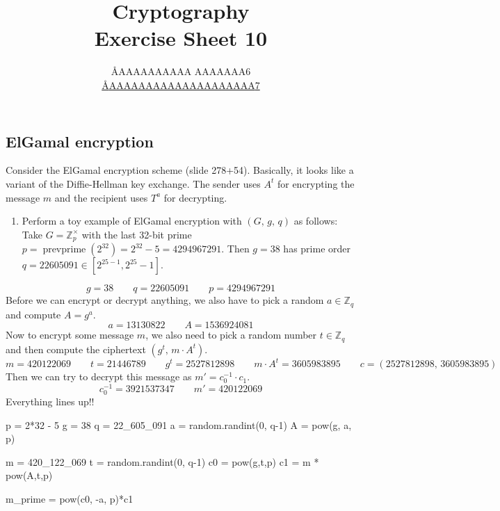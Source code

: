 \documentclass{article}
\title{Cryptography \\ Exercise Sheet 10}
\author{
  \AA{AAAAAAAAAA AAAAAAA}{6} \\
  \href{mailto:\AA{AAAAAAAAAAAAAAAAAAAA}{7}}{\AA{AAAAAAAAAAAAAAAAAAAA}{7}}
}
\newcommand{\Z}{\mathbb{Z}}
\begin{document}
  \maketitle

  \setcounter{section}{10}
  \subsection{ElGamal encryption}
  \begin{centerframebox}
    Consider the ElGamal encryption scheme (slide 278+54). Basically, it looks
    like a variant of the Diffie-Hellman key exchange. The sender uses $A^t$
    for encrypting the message $m$ and the recipient uses $T^a$ for decrypting.

    \begin{enumerate}[label=(\roman*)]
      \item Perform a toy example of ElGamal encryption with $(G,\, g,\, q)$ as follows:
      Take $G = \Z^\times_p$  with the last 32-bit prime $p = \operatorname{prevprime}(2^{32}) = 2^{32} - 5 = 4 294 967 291$.
      Then $g = 38$ has prime order $q = 22 605 091 \in [2^{25-1}, 2^{25}-1]$.
    \end{enumerate}
  \end{centerframebox}
  \[ g = 38 \qquad q = 22 605 091 \qquad p = 4 294 967 291 \]
  Before we can encrypt or decrypt anything, we also have to pick a random $a \in \Z_q$ and compute $A = g^a$.
  \[ a = 13 130 822 \qquad A = 1 536 924 081 \]
  Now to encrypt some message $m$, we also need to pick a random number $t \in \Z_q$
  and then compute the ciphertext $(g^t,\, m \cdot A^t)$.
  \[ m = 420 122 069 \qquad t = 21 446 789 \qquad  g^t = 2 527 812 898 \qquad m \cdot A^t = 3 605 983 895
  \qquad c = (2 527 812 898,\, 3 605 983 895 ) \]
  Then we can try to decrypt this message as $m' = c_0^{-1} \cdot c_1$.
  \[ c_0^{-1} = 3 921 537 347 \qquad m' = 420 122 069 \]
  Everything lines up!!

  \begin{mylisting}
    p = 2*32 - 5
    g = 38
    q = 22_605_091
    a = random.randint(0, q-1)
    A = pow(g, a, p)

    m = 420_122_069
    t = random.randint(0, q-1)
    c0 = pow(g,t,p)
    c1 = m * pow(A,t,p) %

    m_prime = pow(c0, -a, p)*c1 %
  \end{mylisting}
\end{document}
